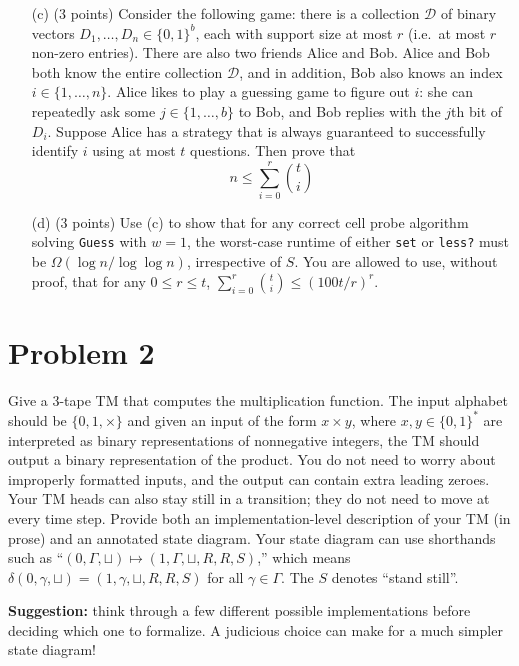 \documentclass[12pt]{article}
\begin{document}
\begin{itemize}
\item[(c)] (3 points) Consider the following game: there is a collection $\mathcal{D}$ of binary vectors $D_1,\ldots,D_n\in\{0,1\}^b$, each with support size at most $r$ (i.e.\ at most $r$ non-zero entries). There are also two friends Alice and Bob. Alice and Bob both know the entire collection $\mathcal{D}$, and in addition, Bob also knows an index $i\in\{1,\ldots,n\}$. Alice likes to play a guessing game to figure out $i$: she can repeatedly ask some $j\in\{1,\ldots,b\}$ to Bob, and Bob replies with the $j$th bit of $D_i$. Suppose Alice has a strategy that is always guaranteed to successfully identify $i$ using at most $t$ questions. Then prove that
$$
n \le \sum_{i=0}^r \binom{t}{i}
$$
\item[(d)] (3 points) Use (c) to show that for any correct cell probe algorithm solving \texttt{Guess} with $w=1$, the worst-case runtime of either \texttt{set} or \texttt{less?} must be $\Omega(\log n/\log\log n)$, irrespective of $S$.  You are allowed to use, without proof, that for any $0\le r\le t$, $\sum_{i=0}^r \binom{t}{i} \le (100t/r)^r$.
\end{itemize}


\section*{Problem 2}

Give a 3-tape TM that computes the multiplication function.  The input alphabet should be $\{0,1,\times\}$ and given an input of the form $x\times y$, where $x,y\in \{0,1\}^*$ are interpreted as binary representations of nonnegative integers, the TM should output a binary representation of  the product.  You do not need to worry about improperly formatted inputs, and the output can contain extra leading zeroes.   Your TM heads can also stay still in a transition; they do not need to move at every time step.  Provide both an implementation-level description of your TM (in prose) and an annotated state diagram.  Your state diagram can use shorthands such as ``$(0,\Gamma,\sqcup) \mapsto (1,\Gamma,\sqcup,R,R,S)$,'' which means $\delta(0,\gamma,\sqcup) = (1,\gamma,\sqcup,R,R,S)$ for all $\gamma\in \Gamma$. The $S$ denotes ``stand still''.

\medskip

\noindent\textbf{Suggestion:} think through a few different possible implementations before deciding which one to formalize.  A judicious choice can make for a much simpler state diagram!
\end{document}
